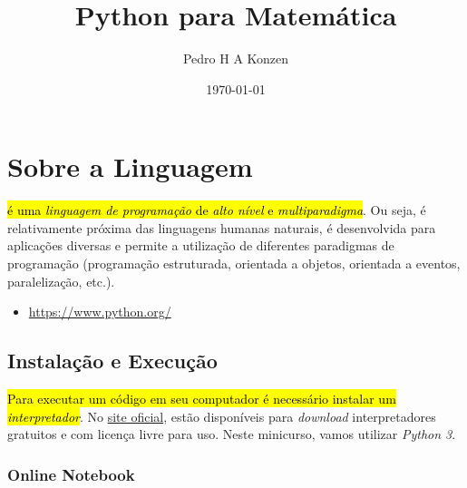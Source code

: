 \documentclass[a4paper,10pt,twoside]{article}
\begin{document}
\title{Python para Matemática}
\author{Pedro H A Konzen}
\date{\today}

\maketitle

\ifishtml
\clearpage
{}
{}
\fi
\tableofcontents






\section{Sobre a Linguagem}\label{sec_sobrepy}

\hl{{\python} é uma \emph{linguagem de programação} de \emph{alto nível} e \emph{multiparadigma}}. Ou seja, é relativamente próxima das linguagens humanas naturais, é desenvolvida para aplicações diversas e permite a utilização de diferentes paradigmas de programação (programação estruturada, orientada a objetos, orientada a eventos, paralelização, etc.).

\begin{itemize}
\item {}
  \begin{center}
    \href{https://www.python.org/}{https://www.python.org/}
  \end{center}
\end{itemize}

\subsection{Instalação e Execução}

\hl{Para executar um código {\python} em seu computador é necessário instalar um \emph{interpretador}}. No \href{https://www.python.org/}{site oficial}, estão disponíveis para \textit{download} interpretadores gratuitos e com licença livre para uso. Neste minicurso, vamos utilizar \emph{Python 3}.

\subsubsection{Online Notebook}
\end{document}
